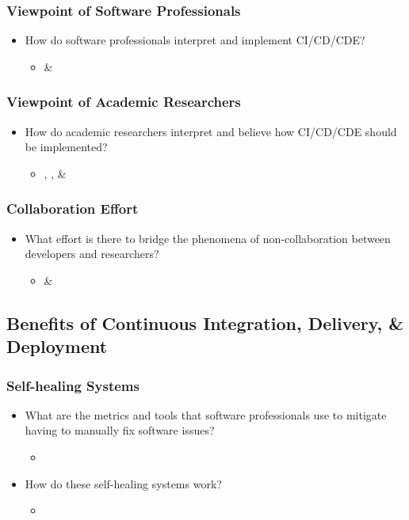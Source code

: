 \documentclass[12pt,a4paper]{article}
\begin{document}
		\subsubsection{Viewpoint of Software Professionals}
		\begin{itemize}[noitemsep]
			\item How do software professionals interpret and implement CI/CD/CDE?
			\begin{itemize}
				\item \cite{atkinson_edwards_2018} \& \cite{stackify_2018}
			\end{itemize}
		\end{itemize}
		\subsubsection{Viewpoint of Academic Researchers}
		\begin{itemize}[noitemsep]
			\item How do academic researchers interpret and believe how CI/CD/CDE should be implemented?
			\begin{itemize}
				\item \cite{bosch_2014}, \cite{shahin_babar_zhu_2017}, \& \cite{stahl_2017}
			\end{itemize}
		\end{itemize}
		\subsubsection{Collaboration Effort}
		\begin{itemize}[noitemsep]
			\item What effort is there to bridge the phenomena of non-collaboration between developers and researchers?
			\begin{itemize}
				\item \cite{bosch_2014} \& \cite{stahl_2017}
			\end{itemize}
		\end{itemize}

	\subsection{Benefits of Continuous Integration, Delivery, \& Deployment}
		\subsubsection{Self-healing Systems}
		\begin{itemize}[noitemsep]
			\item What are the metrics and tools that software professionals use to mitigate having to manually fix software issues?
			\begin{itemize}
				\item \cite{bosch_2014}
			\end{itemize}
			\item How do these self-healing systems work?
			\begin{itemize}
				\item \cite{bosch_2014}
			\end{itemize}
		\end{itemize}
\end{document}
